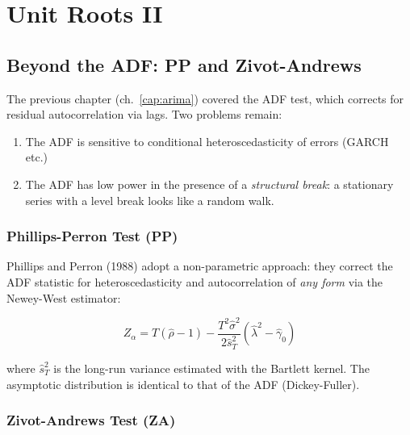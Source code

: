 \chapter{Unit Roots II}
\label{cap:raiz_unitaria2}

\section{Beyond the ADF: PP and Zivot-Andrews}

The previous chapter (ch.~\ref{cap:arima}) covered the ADF test, which corrects
for residual autocorrelation via lags. Two problems remain:

\begin{enumerate}
  \item The ADF is sensitive to conditional heteroscedasticity of errors (GARCH etc.)
  \item The ADF has low power in the presence of a \emph{structural break}: a
        stationary series with a level break looks like a random walk.
\end{enumerate}

\subsection*{Phillips-Perron Test (PP)}

Phillips and Perron (1988) adopt a non-parametric approach: they correct the
ADF statistic for heteroscedasticity and autocorrelation of \emph{any
form} via the Newey-West estimator:

\[
  Z_\alpha = T(\hat{\rho} - 1) - \frac{T^2 \hat{\sigma}^2}{2\hat{s}_T^2}(\hat{\lambda}^2 - \hat{\gamma}_0)
\]

where $\hat{s}_T^2$ is the long-run variance estimated with the Bartlett kernel.
The asymptotic distribution is identical to that of the ADF (Dickey-Fuller).

\subsection*{Zivot-Andrews Test (ZA)}

